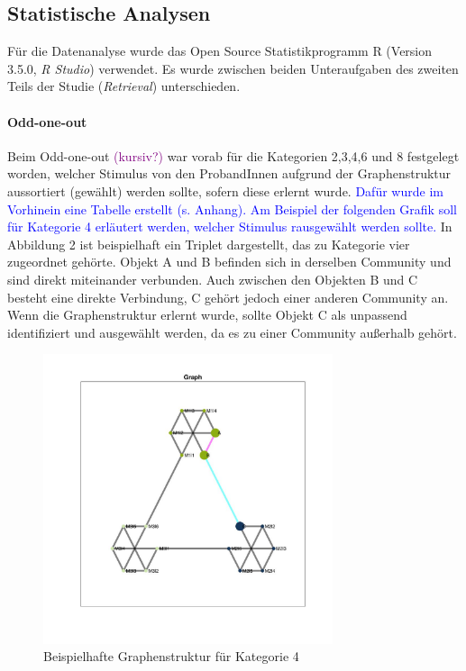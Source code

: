 \subsection{Statistische Analysen}
Für die Datenanalyse wurde das Open Source Statistikprogramm R (Version 3.5.0, \textit{R Studio}) verwendet.
Es wurde zwischen beiden Unteraufgaben des zweiten Teils der Studie (\textit{Retrieval}) unterschieden.

\paragraph{Odd-one-out}
Beim Odd-one-out \textcolor{purple}{(kursiv?)} war vorab für die Kategorien 2,3,4,6 und 8 festgelegt worden, welcher Stimulus von den ProbandInnen aufgrund der Graphenstruktur aussortiert (gewählt) werden sollte, sofern diese erlernt wurde. \textcolor{blue}{Dafür wurde im Vorhinein eine Tabelle erstellt (s. Anhang). Am Beispiel der folgenden Grafik soll für Kategorie 4 erläutert werden, welcher Stimulus rausgewählt werden sollte.}
In Abbildung 2 ist beispielhaft ein Triplet dargestellt, das zu Kategorie vier zugeordnet gehörte. Objekt A und B befinden sich in derselben Community und sind direkt miteinander verbunden. Auch zwischen den Objekten B und C besteht eine direkte Verbindung, C gehört jedoch einer anderen Community an. Wenn die Graphenstruktur erlernt wurde, sollte Objekt C als unpassend identifiziert und ausgewählt werden, da es zu einer Community außerhalb gehört.

\begin{figure}[h]
    \centering
    \includegraphics[width=85mm]{cat04_2716_tripletVisual.jpg}
    \caption{Beispielhafte Graphenstruktur für Kategorie 4}
    \label{fig:my_label}
\end{figure}


